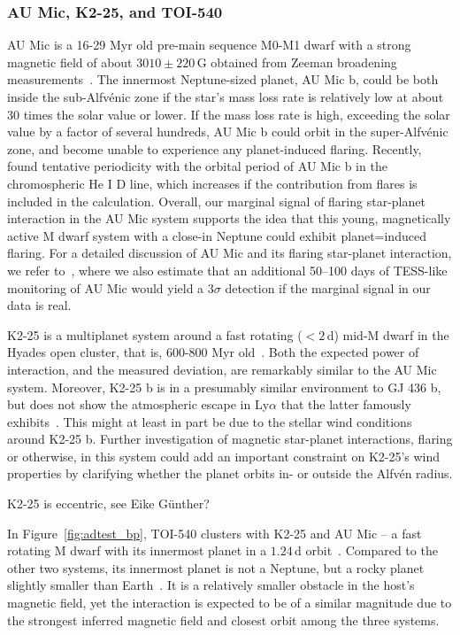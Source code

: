 \documentclass[twocolumn]{aastex631}
\begin{document}
\subsubsection{AU Mic, K2-25, and TOI-540}
\label{sec:results:individualstars:aumic}

AU Mic is a 16-29 Myr old pre-main sequence M0-M1 dwarf with a strong magnetic field of about $3010\pm220\,$G obtained from Zeeman broadening measurements~\citep{reiners2022magnetism}. The innermost Neptune-sized planet, AU Mic b, could be both inside the sub-Alfv\'enic zone if the star's mass loss rate is relatively low at about 30 times the solar value or lower. If the mass loss rate is high, exceeding the solar value by a factor of several hundreds, AU Mic b could orbit in the super-Alfv\'enic zone, and become unable to experience any planet-induced flaring. Recently, \citet{klein2022one} found tentative periodicity with the orbital period of AU Mic b in the chromospheric He I D line, which increases if the contribution from flares is included in the calculation. Overall, our marginal signal of flaring star-planet interaction in the AU Mic system supports the idea that this young, magnetically active M dwarf system with a close-in Neptune could exhibit planet=induced flaring.
For a detailed discussion of AU Mic and its flaring star-planet interaction, we refer to~\cite{ilin2022searching}, where we also estimate that an additional 50–100 days of TESS-like monitoring of AU Mic would yield a $3\sigma$ detection if the marginal signal in our data is real.
 
K2-25 is a multiplanet system around a fast rotating ($<2\,$d) mid-M dwarf in the Hyades open cluster, that is, 600-800 Myr old~\citep{stefansson2020habitable}. Both the expected power of interaction, and the measured deviation, are remarkably similar to the AU Mic system. Moreover, K2-25 b is in a presumably similar environment to GJ 436 b, but does not show the atmospheric escape in Ly$\alpha$ that the latter famously exhibits~\citep{rockcliffe2021lya}. This might at least in part be due to the stellar wind conditions around K2-25 b. Further investigation of magnetic star-planet interactions, flaring or otherwise, in this system could add an important constraint on K2-25's wind properties by clarifying whether the planet orbits in- or outside the Alfv\'en radius.

K2-25 is eccentric, see Eike Günther?

In Figure~\ref{fig:adtest_bp}, TOI-540 clusters with K2-25 and AU Mic -- a fast rotating M dwarf with its innermost planet in a $1.24\,$d orbit~\citep{ment2021toi}. Compared to the other two systems, its innermost planet is not a Neptune, but a rocky planet slightly smaller than Earth~\citep{ment2021toi}. It is a relatively smaller obstacle in the host's magnetic field, yet the interaction is expected to be of a similar magnitude due to the strongest inferred magnetic field and closest orbit among the three systems. 
\end{document}
